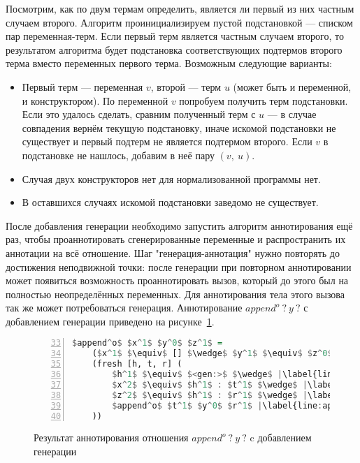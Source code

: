 Посмотрим, как по двум термам определить, является ли первый из них частным случаем второго.
Алгоритм проинициализируем пустой подстановкой --- списком пар переменная-терм.
Если первый терм является частным случаем второго, то результатом алгоритма будет подстановка соответствующих подтермов второго терма вместо переменных первого терма.
Возможным следующие варианты:
\begin{itemize}
    \item Первый терм --- переменная $v$, второй --- терм $u$ (может быть и переменной, и конструктором).
    По переменной $v$ попробуем получить терм подстановки.
    Если это удалось сделать, сравним полученный терм с $u$ --- в случае совпадения вернём текущую подстановку, иначе искомой подстановки не существует и первый подтерм не является подтермом второго.
    Если $v$ в подстановке не нашлось, добавим в неё пару $(v,~u)$.
    \item Случая двух конструкторов нет для нормализованной программы нет.
    \item В оставшихся случаях искомой подстановки заведомо не существует.
\end{itemize}

После добавления генерации необходимо запустить алгоритм аннотирования ещё раз, чтобы проаннотировать сгенерированные переменные и распространить их аннотации на всё отношение.
Шаг "генерация-аннотация" нужно повторять до достижения неподвижной точки: после генерации при повторном аннотировании может появиться возможность проаннотировать вызов, который до этого был на полностью неопределённых переменных.
Для аннотирования тела этого вызова так же может потребоваться генерация.
Аннотирование $append^o \ ? \ y \ ?$ с добавлением генерации приведено на рисунке~\ref{lst:appendoOIOANN}.

\begin{figure}[h!]
  \begin{center}
  \begin{minipage}{0.4\textwidth}
  \begin{lstlisting}[language=Haskell, frame=single, numbers=left,numberstyle=\small, firstnumber=33, escapechar=|]
  $append^o$ $x^1$ $y^0$ $z^1$ =
    ($x^1$ $\equiv$ [] $\wedge$ $y^1$ $\equiv$ $z^0$) $\vee$ |\label{line:appendoOIOANN2}|
    (fresh [h, t, r] (
        $h^1$ $\equiv$ $<gen:>$ $\wedge$ |\label{line:appendoOIOANN4}|
        $x^2$ $\equiv$ $h^1$ : $t^1$ $\wedge$ |\label{line:appendoOIOANN5}|
        $z^2$ $\equiv$ $h^1$ : $r^1$ $\wedge$ |\label{line:appendoOIOANN6}|
        $append^o$ $t^1$ $y^0$ $r^1$ |\label{line:appendoOIOANN7}|
    ))
    \end{lstlisting}
  \end{minipage}
  \end{center}
  \caption{Результат аннотирования отношения $append^o \ ? \ y \ ?$ c добавлением генерации}
  \label{lst:appendoOIOANN}
\end{figure}

